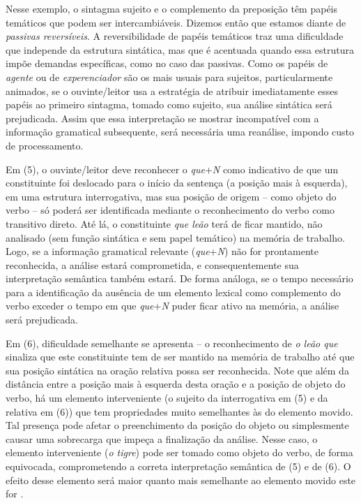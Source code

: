 \documentclass[output=paper,colorlinks,citecolor=brown,booklanguage=portuguese]{langscibook}
\begin{document}
Nesse exemplo, o sintagma sujeito e o complemento da preposição têm papéis temáticos que podem ser intercambiáveis. Dizemos então que estamos diante de \emph{passivas reversíveis}. A reversibilidade de papéis temáticos traz uma dificuldade que independe da estrutura sintática, mas que é acentuada quando essa estrutura impõe demandas específicas, como no caso das passivas. Como os papéis de \emph{agente} ou de \emph{experenciador} são os mais usuais para sujeitos, particularmente animados, se o ouvinte/leitor usa a estratégia de atribuir imediatamente esses papéis ao primeiro sintagma, tomado como sujeito, sua análise sintática será prejudicada. Assim que essa interpretação se mostrar incompatível com a informação gramatical subsequente, será necessária uma reanálise, impondo custo de processamento. 

Em (5), o ouvinte/leitor deve reconhecer o \emph{que}+\emph{N} como indicativo de que um constituinte foi deslocado para o início da sentença (a posição mais à esquerda), em uma estrutura interrogativa, mas sua posição de origem – como objeto do verbo – só poderá ser identificada mediante o reconhecimento do verbo como transitivo direto. Até lá, o constituinte \emph{que leão } terá de ficar mantido, não analisado (sem função sintática e sem papel temático) na memória de trabalho. Logo, se a informação gramatical relevante (\emph{que}+\emph{N}) não for prontamente reconhecida, a análise estará comprometida, e consequentemente sua interpretação semântica também estará. De forma análoga, se o tempo necessário para a identificação da ausência de um elemento lexical como complemento do verbo exceder o tempo em que \emph{que}+\emph{N} puder ficar ativo na memória, a análise será prejudicada. 

Em (6), dificuldade semelhante se apresenta – o reconhecimento de \emph{o leão que} sinaliza que este constituinte tem de ser mantido na memória de trabalho até que sua posição sintática na oração relativa possa ser reconhecida. Note que além da distância entre a posição mais à esquerda desta oração e a posição de objeto do verbo, há um elemento interveniente (o sujeito da interrogativa em (5) e da relativa em (6)) que tem propriedades muito semelhantes às do elemento movido. Tal presença pode afetar o preenchimento da posição do objeto ou simplesmente causar uma sobrecarga que impeça a finalização da análise. Nesse caso, o elemento interveniente (\emph{o tigre}) pode ser tomado como objeto do verbo, de forma equivocada, comprometendo a correta interpretação semântica de (5) e de (6). O efeito desse elemento será maior quanto mais semelhante ao elemento movido este for \citep{Grillo2008, Friedmann2009}. 
\end{document}
